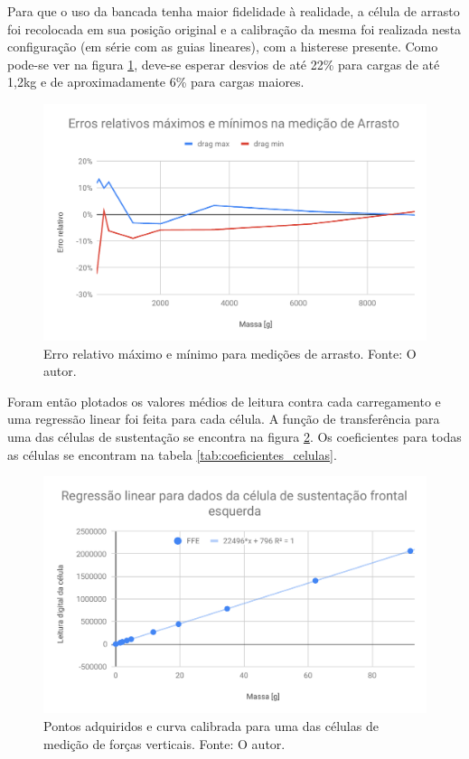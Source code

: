 Para que o uso da bancada tenha maior fidelidade à realidade, a célula de arrasto foi recolocada em sua posição original e a calibração da mesma foi realizada nesta configuração (em série com as guias lineares), com a histerese presente. Como pode-se ver na figura \ref{fig:curva_erros_arrasto}, deve-se esperar desvios de até 22\% para cargas de até 1,2kg e de aproximadamente 6\% para cargas maiores.

\begin{figure}[!ht]
    \centering
    \includegraphics[width=.8\linewidth]{plots/celulas_plot_1.pdf}
    \caption{Erro relativo máximo e mínimo para medições de arrasto. Fonte: O autor.}
    \label{fig:curva_erros_arrasto}
\end{figure}

Foram então plotados os valores médios de leitura contra cada carregamento e uma regressão linear foi feita para cada célula. A função de transferência para uma das células de sustentação se encontra na figura \ref{fig:curva_celula_vertical}. Os coeficientes para todas as células se encontram na tabela \ref{tab:coeficientes_celulas}.

\begin{figure}[!ht]
    \centering
    \includegraphics[width=.8\linewidth]{figuras/calibracao/plot_regressao_sustentacao.pdf}
    \caption{Pontos adquiridos e curva calibrada para uma das células de medição de forças verticais. Fonte: O autor.}
    \label{fig:curva_celula_vertical}
\end{figure}


